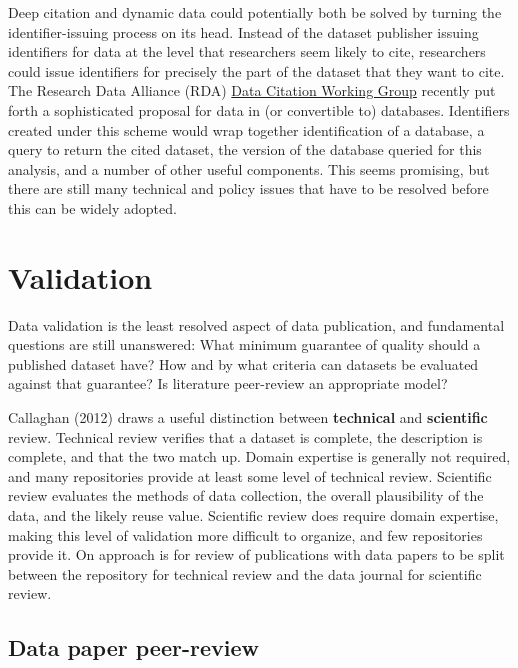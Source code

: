 \documentclass[10pt,twocolumn]{article}
\begin{document}
Deep citation and dynamic data could potentially both be solved by turning the identifier-issuing process on its head.
Instead of the dataset publisher issuing identifiers for data at the level that researchers seem likely to cite, researchers could issue identifiers for precisely the part of the dataset that they want to cite.
The Research Data Alliance (RDA) \href{http://rd-alliance.org/working-groups/data-citation-wg.html}{Data Citation Working Group} recently put forth a sophisticated proposal for data in (or convertible to) databases.
Identifiers created under this scheme would wrap together identification of a database, a query to return the cited dataset, the version of the database queried for this analysis, and a number of other useful components.
This seems promising, but there are still many technical and policy issues that have to be resolved before this can be widely adopted.

\section*{Validation}\label{validation}

Data validation is the least resolved aspect of data publication, and fundamental questions are still unanswered:
What minimum guarantee of quality should a published dataset have?
How and by what criteria can datasets be evaluated against that guarantee?
Is literature peer-review an appropriate model?

Callaghan (2012)\cite{sarah_callaghan_making_2012} draws a useful distinction between \textbf{technical} and \textbf{scientific} review.
Technical review verifies that a dataset is complete, the description is complete, and that the two match up.
Domain expertise is generally not required, and many repositories provide at least some level of technical review.
Scientific review evaluates the methods of data collection, the overall plausibility of the data, and the likely reuse value.
Scientific review does require domain expertise, making this level of validation more difficult to organize, and few repositories provide it.
On approach is for review of publications with data papers to be split between the repository for technical review and the data journal for scientific review.

\subsection*{Data paper peer-review}\label{data-paper-peer-review}
\end{document}
